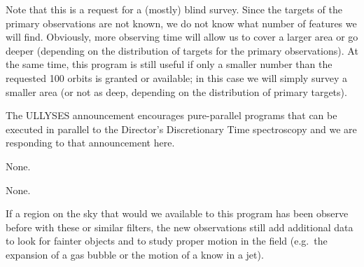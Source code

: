 \documentclass[12pt]{article}
\begin{document}
Note that this is a request for a (mostly) blind survey. Since the targets of the primary observations are not known, we do not know what number of features we will find. Obviously, more observing time will allow us to cover a larger area or go deeper (depending on the distribution of targets for the primary observations). At the same time, this program is still useful if only a smaller number than the requested 100 orbits is granted or available; in this case we will simply survey a smaller area (or not as deep, depending on the distribution of primary targets).

\vspace{1mm}
\noindent The ULLYSES announcement encourages pure-parallel programs that can be executed in parallel to the Director's Discretionary Time spectroscopy and we are responding to that announcement here.



%
%
\specialreq             %
None.


%
%
\coordinatedobs          %
None.


%
%
\duplications           %
If a region on the sky that would we available to this program has been observe before with these or similar filters, the new observations still add additional data to look for fainter objects and to study proper motion in the field (e.g.\ the expansion of a gas bubble or the motion of a know in a jet).


\end{document}
